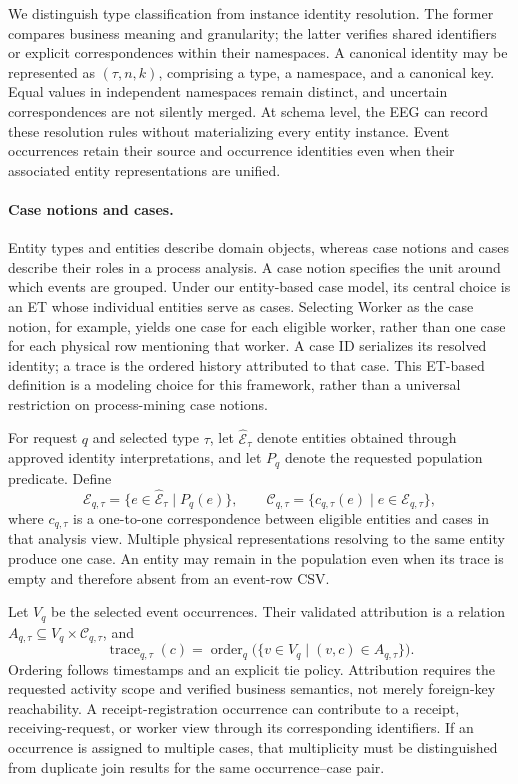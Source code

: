 We distinguish type classification from instance identity resolution. The former compares business meaning and granularity; the latter verifies shared identifiers or explicit correspondences within their namespaces. A canonical identity may be represented as $(\tau,n,k)$, comprising a type, a namespace, and a canonical key. Equal values in independent namespaces remain distinct, and uncertain correspondences are not silently merged. At schema level, the EEG can record these resolution rules without materializing every entity instance. Event occurrences retain their source and occurrence identities even when their associated entity representations are unified.


\paragraph{Case notions and cases.}
Entity types and entities describe domain objects, whereas case notions and cases describe their roles in a process analysis. A case notion specifies the unit around which events are grouped. Under our entity-based case model, its central choice is an ET whose individual entities serve as cases. Selecting Worker as the case notion, for example, yields one case for each eligible worker, rather than one case for each physical row mentioning that worker. A case ID serializes its resolved identity; a trace is the ordered history attributed to that case. This ET-based definition is a modeling choice for this framework, rather than a universal restriction on process-mining case notions.

For request $q$ and selected type $\tau$, let $\widehat{\mathcal E}_\tau$ denote entities obtained through approved identity interpretations, and let $P_q$ denote the requested population predicate. Define
\[
\mathcal E_{q,\tau}=\{e\in\widehat{\mathcal E}_\tau\mid P_q(e)\},
\qquad
\mathcal C_{q,\tau}=\{c_{q,\tau}(e)\mid e\in\mathcal E_{q,\tau}\},
\]
where $c_{q,\tau}$ is a one-to-one correspondence between eligible entities and cases in that analysis view. Multiple physical representations resolving to the same entity produce one case. An entity may remain in the population even when its trace is empty and therefore absent from an event-row CSV.

Let $V_q$ be the selected event occurrences. Their validated attribution is a relation $A_{q,\tau}\subseteq V_q\times\mathcal C_{q,\tau}$, and
\[
\operatorname{trace}_{q,\tau}(c)
=\operatorname{order}_q\bigl(\{v\in V_q\mid(v,c)\in A_{q,\tau}\}\bigr).
\]
Ordering follows timestamps and an explicit tie policy. Attribution requires the requested activity scope and verified business semantics, not merely foreign-key reachability. A receipt-registration occurrence can contribute to a receipt, receiving-request, or worker view through its corresponding identifiers. If an occurrence is assigned to multiple cases, that multiplicity must be distinguished from duplicate join results for the same occurrence--case pair.

